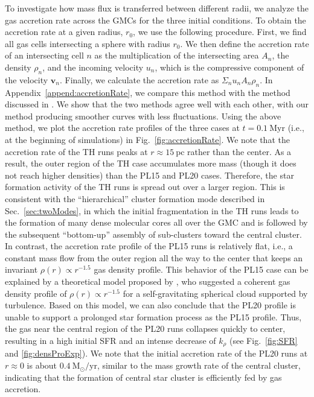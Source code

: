 \documentclass[fleqn,usenatbib]{mnras}
\begin{document}
To investigate how mass flux is transferred between different radii, we analyze the gas accretion rate across the GMCs for the three initial conditions.
To obtain the accretion rate at a given radius, $r_0$, we use the following procedure.
First, we find all gas cells intersecting a sphere with radius $r_0$.
We then define the accretion rate of an intersecting cell $n$ as the multiplication of the intersecting area $A_n$, the density $\rho_n$, and the incoming velocity $u_n$, which is the compressive component of the velocity $\mathbf{v}_n$.
Finally, we calculate the accretion rate as $\Sigma_n u_n A_n \rho_n$.
In Appendix~\ref{append:accretionRate}, we compare this method with the method discussed in \citet{howard_universal_2018}.
We show that the two methods agree well with each other, with our method producing smoother curves with less fluctuations.
Using the above method, we plot the accretion rate profiles of the three cases at $t=0.1\ \mathrm{Myr}$ (i.e., at the beginning of simulations) in Fig.~\ref{fig:accretionRate}.
We note that the accretion rate of the TH runs peaks at $r\approx15\ \mathrm{pc}$ rather than the center.
As a result, the outer region of the TH case accumulates more mass (though it does not reach higher densities) than the PL15 and PL20 cases.
Therefore, the star formation activity of the TH runs is spread out over a larger region.
This is consistent with the ``hierarchical'' cluster formation mode described in Sec.~\ref{sec:twoModes}, in which the initial fragmentation in the TH runs leads to the formation of many dense molecular cores all over the GMC and is followed by the subsequent ``bottom-up'' assembly of sub-clusters toward the central cluster.
In contrast, the accretion rate profile of the PL15 runs is relatively flat, i.e., a constant mass flow from the outer region all the way to the center that keeps an invariant $\rho(r)\propto r^{-1.5}$ gas density profile.
This behavior of the PL15 case can be explained by a theoretical model proposed by \citet{murray_star_2015}, who suggested a coherent gas density profile of $\rho(r)\propto r^{-1.5}$ for a self-gravitating spherical cloud supported by turbulence.
Based on this model, we can also conclude that the PL20 profile is unable to support a prolonged star formation process as the PL15 profile.
Thus, the gas near the central region of the PL20 runs collapses quickly to center, resulting in a high initial SFR and an intense decrease of $k_\rho$ (see Fig.~\ref{fig:SFR} and \ref{fig:densProExp}).
We note that the initial accretion rate of the PL20 runs at $r\approx0$ is about $0.4\ \mathrm{M_\odot/yr}$, similar to the mass growth rate of the central cluster, indicating that the formation of central star cluster is efficiently fed by gas accretion.
\end{document}

